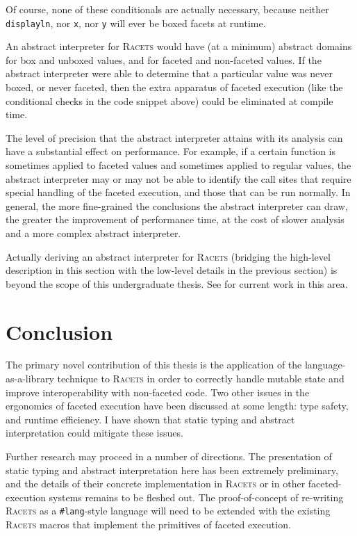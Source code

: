 \documentclass{article}
\begin{document}
Of course, none of these conditionals are actually necessary, because neither \texttt{displayln}, nor \texttt{x}, nor \texttt{y} will ever be boxed facets at runtime.

An abstract interpreter for \textsc{Racets} would have (at a minimum) abstract domains for box and unboxed values, and for faceted and non-faceted values. If the abstract interpreter were able to determine that a particular value was never boxed, or never faceted, then the extra apparatus of faceted execution (like the conditional checks in the code snippet above) could be eliminated at compile time.

The level of precision that the abstract interpreter attains with its analysis can have a substantial effect on performance. For example, if a certain function is sometimes applied to faceted values and sometimes applied to regular values, the abstract interpreter may or may not be able to identify the call sites that require special handling of the faceted execution, and those that can be run normally. In general, the more fine-grained the conclusions the abstract interpreter can draw, the greater the improvement of performance time, at the cost of slower analysis and a more complex abstract interpreter.

Actually deriving an abstract interpreter for \textsc{Racets} (bridging the high-level description in this section with the low-level details in the previous section) is beyond the scope of this undergraduate thesis. See \cite{abstract-inter} for current work in this area.



\section{Conclusion\label{sec:conclusion}}
The primary novel contribution of this thesis is the application of the language-as-a-library technique to \textsc{Racets} in order to correctly handle mutable state and improve interoperability with non-faceted code. Two other issues in the ergonomics of faceted execution have been discussed at some length: type safety, and runtime efficiency. I have shown that static typing and abstract interpretation could mitigate these issues.

Further research may proceed in a number of directions. The presentation of static typing and abstract interpretation here has been extremely preliminary, and the details of their concrete implementation in \textsc{Racets} or in other faceted-execution systems remains to be fleshed out. The proof-of-concept of re-writing \textsc{Racets} as a \texttt{\#lang}-style language will need to be extended with the existing \textsc{Racets} macros that implement the primitives of faceted execution.
\end{document}
